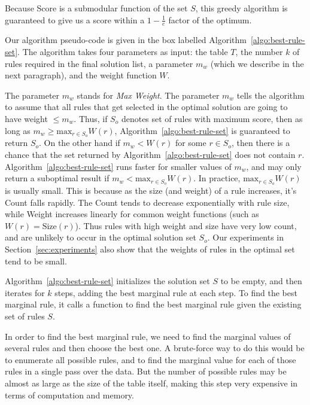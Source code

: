 Because Score is a submodular function of the set $S$, this greedy algorithm is guaranteed to give us a score within a $1 - \frac{1}{e}$ factor of the optimum. 

Our algorithm pseudo-code is given in the box labelled Algorithm~\ref{algo:best-rule-set}. The algorithm takes four parameters as input: the table $T$, the number $k$ of rules required in the final solution list, a parameter $m_w$ (which we describe in the next paragraph), and the weight function $W$. 

The parameter $m_w$ stands for \textit{Max Weight}. The parameter $m_w$ tells the algorithm to assume that all rules that get selected in the optimal solution are going to have weight $\leq m_w$. Thus, if $S_o$ denotes set of rules with maximum score, then as long as $m_w \geq \textrm{max}_{r \in S_o}W(r)$, Algorithm~\ref{algo:best-rule-set} is guaranteed to return $S_o$. On the other hand if $m_w < W(r)$ for some $r \in S_o$, then there is a chance that the set returned by Algorithm~\ref{algo:best-rule-set} does not contain $r$. Algorithm~\ref{algo:best-rule-set} runs faster for smaller values of $m_w$, and may only return a suboptimal result if $m_w < \textrm{max}_{r \in S_o}W(r)$. In practice, $\textrm{max}_{r \in S_o}W(r)$ is usually small. This is because as the size (and weight) of a rule increases, it's Count falls rapidly. The Count tends to decrease exponentially with rule size, while Weight increases linearly for common weight functions (such as $W(r) = \text{Size}(r)$). Thus rules with high weight and size have very low count, and are unlikely to occur in the optimal solution set $S_o$. Our experiments in Section~\ref{sec:experiments} also show that the weights of rules in the optimal set tend to be small.


Algorithm~\ref{algo:best-rule-set} initializes the solution set $S$ to be empty, and then iterates for $k$ steps, adding the best marginal rule at each step. To find the best marginal rule, it calls a function to find the best marginal rule given the existing set of rules $S$. 

In order to find the best marginal rule, we need to find the marginal values of several rules and then choose the best one. A brute-force way to do this would be to enumerate all possible rules, and to find the marginal value for each of those rules in a single pass over the data. But the number of possible rules may be almost as large as the size of the table itself, making this step very expensive in terms of computation and memory. 

